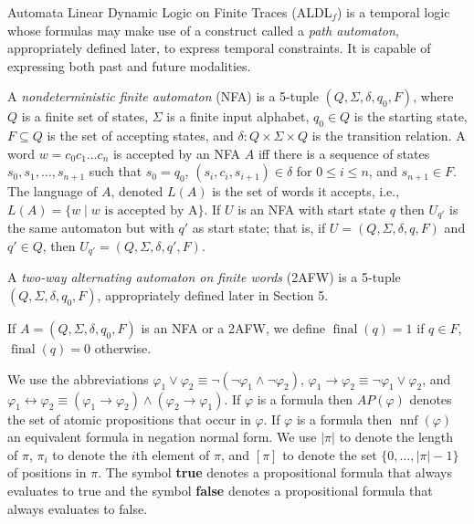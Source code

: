 \documentclass[10pt,a4paper]{amsart}
\theoremstyle{plain}
\theoremstyle{definition}
\theoremstyle{definition}
\DeclareMathOperator{\nnf}{nnf}
\DeclareMathOperator{\?}{?}
\DeclareMathOperator{\final}{final}
\begin{document}
Automata Linear Dynamic Logic on Finite Traces (ALDL$_f$) is a temporal logic whose formulas may make use of a construct called a \textit{path automaton}, appropriately defined later, to express temporal constraints. It is capable of expressing both past and future modalities.

A \textit{nondeterministic finite automaton} (NFA) is a 5-tuple  $(Q,\Sigma, \delta, q_0,F)$, where $Q$ is a finite set of states, $\Sigma$ is a finite input alphabet, $q_0 \in Q$ is the starting state, $F \subseteq Q$ is the set of accepting states, and $\delta : Q \times \Sigma \times Q$ is the transition relation. A word $w = c_0c_1 \ldots c_n$ is accepted by an NFA $A$ iff there is a sequence of states $s_0,s_1,\ldots,s_{n+1}$ such that $s_0 = q_0$, $(s_i, c_i, s_{i+1}) \in \delta$ for $0 \leq i \leq n$, and $s_{n+1} \in F$. The language of $A$, denoted $L(A)$ is the set of words it accepts, i.e., $L(A) = \{ w \mid w \text{ is accepted by A} \}$. If $U$ is an NFA with start state $q$ then $U_{q'}$ is the same automaton but with $q'$ as start state; that is, if $U = (Q,\Sigma,\delta,q,F)$ and $q' \in Q$, then $U_{q'} = (Q,\Sigma,\delta,q',F)$.

A \textit{two-way alternating automaton on finite words} (2AFW) is a 5-tuple $(Q, \Sigma, \delta, q_0, F)$, appropriately defined later in Section 5.

If $A = (Q,\Sigma,\delta,q_0,F)$ is an NFA or a 2AFW, we define $\final(q) = 1$ if $q \in F$, $\final(q) = 0$ otherwise.

We use the abbreviations $\varphi_1 \vee \varphi_2 \equiv \neg(\neg\varphi_1 \wedge \neg\varphi_2)$, $\varphi_1 \rightarrow \varphi_2 \equiv \neg \varphi_1 \vee \varphi_2$,
and $\varphi_1 \leftrightarrow \varphi_2 \equiv (\varphi_1 \rightarrow \varphi_2) \wedge (\varphi_2 \rightarrow \varphi_1)$.
If $\varphi$ is a formula then $AP(\varphi)$ denotes the set of atomic propositions that occur in $\varphi$. If $\varphi$ is a formula then $\nnf(\varphi)$ an equivalent formula in negation normal form.
We use $|\pi|$ to denote the length of $\pi$, $\pi_i$ to denote the $i$th element of $\pi$, and $[\pi]$ to denote the set $\{0,\ldots,|\pi|-1\}$ of positions in $\pi$.
The symbol \textbf{true} denotes a propositional formula that always evaluates to true and the symbol \textbf{false} denotes a propositional formula that always evaluates to false.
\end{document}

